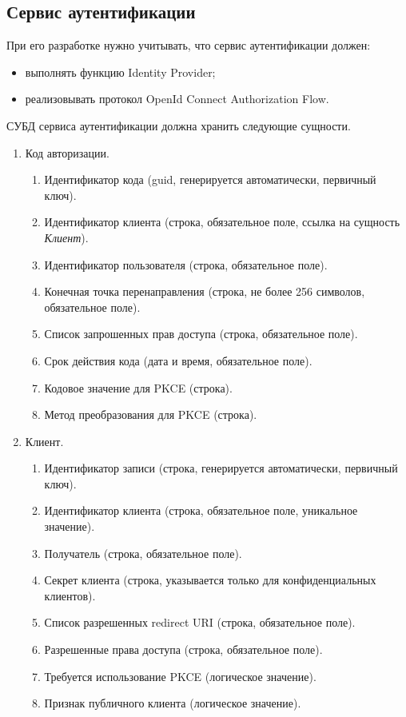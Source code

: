 \subsection{Сервис аутентификации}
При его разработке нужно учитывать, что сервис аутентификации должен:
\begin{itemize}
	\item выполнять функцию Identity Provider;
	\item реализовывать протокол OpenId Connect Authorization Flow.
\end{itemize}
СУБД сервиса аутентификации должна хранить следующие сущности.
\begin{enumerate}
	\item Код авторизации.
		\begin{enumerate}
		\item Идентификатор кода (guid, генерируется автоматически, первичный ключ).
		\item Идентификатор клиента (строка, обязательное поле, ссылка на сущность \textit{Клиент}).
		\item Идентификатор пользователя (строка, обязательное поле).
		\item Конечная точка перенаправления (строка, не более 256 символов, обязательное поле).
		\item Список запрошенных прав доступа (строка, обязательное поле).
		\item Срок действия кода (дата и время, обязательное поле).
		\item Кодовое значение для PKCE (строка).
		\item Метод преобразования для PKCE (строка).
	\end{enumerate}
	\item Клиент.
		\begin{enumerate}
		\item Идентификатор записи (строка, генерируется автоматически, первичный ключ).
		\item Идентификатор клиента (строка, обязательное поле, уникальное значение).
		\item Получатель (строка, обязательное поле).
		\item Секрет клиента (строка, указывается только для конфиденциальных клиентов).
		\item Список разрешенных redirect URI (строка, обязательное поле).
		\item Разрешенные права доступа (строка, обязательное поле).
		\item Требуется использование PKCE (логическое значение).
		\item Признак публичного клиента (логическое значение).
	\end{enumerate}
\end{enumerate}

